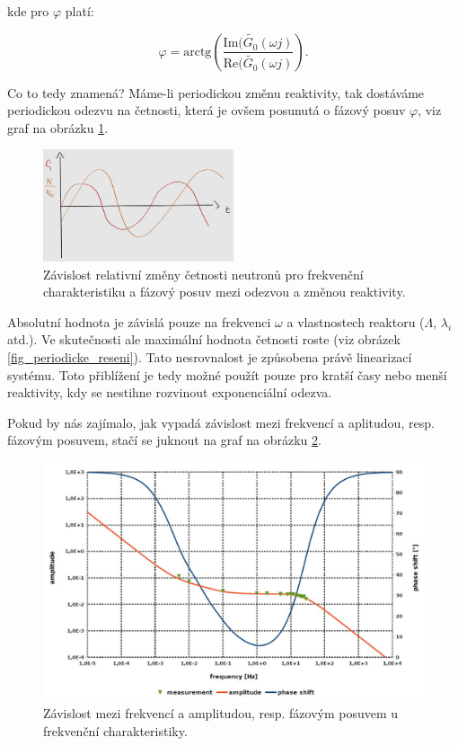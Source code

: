 kde pro $\varphi$ platí:

\begin{equation}
  \boxed{
  \varphi = \text{arctg} \left ( \dfrac{\text{Im} (\tilde{G_0}(\omega j)}{\text{Re}(\tilde{G_0}(\omega j)} \right ).
  \label{frekvencni_charakteristika_faze}}
\end{equation}

Co to tedy znamená? Máme-li periodickou změnu reaktivity, tak dostáváme periodickou odezvu na četnosti, která je ovšem posunutá o fázový posuv $\varphi$, viz graf na obrázku \ref{fig_frekvencni}.

\begin{figure}[H]
 \centering
 \includegraphics[width=0.5\textwidth]{img/frekvencni.jpg}
 \caption{Závislost relativní změny četnosti neutronů pro frekvenční charakteristiku a fázový posuv mezi odezvou a změnou reaktivity.}
 \label{fig_frekvencni}
\end{figure}

Absolutní hodnota je závislá pouze na frekvenci $\omega$ a vlastnostech reaktoru ($\Lambda$, $\lambda_i$ atd.). Ve skutečnosti ale maximální hodnota četnosti roste (viz obrázek \ref{fig_periodicke_reseni}). Tato nesrovnalost je způsobena právě linearizací systému. Toto přiblížení je tedy možné použít pouze pro kratší časy nebo menší reaktivity, kdy se nestihne rozvinout exponenciální odezva.

Pokud by nás zajímalo, jak vypadá závislost mezi frekvencí a aplitudou, resp. fázovým posuvem, stačí se juknout na graf na obrázku \ref{fig_frekvencni_zavislost}.

\begin{figure}[H]
  \centering
  \includegraphics[width=1\textwidth]{img/frekvencni_zavislost.jpg}
  \caption{Závislost mezi frekvencí a amplitudou, resp. fázovým posuvem u frekvenční charakteristiky.}
  \label{fig_frekvencni_zavislost}
\end{figure}

